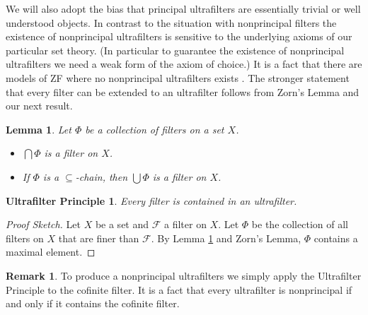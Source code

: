 \documentclass[12pt]{article}
\theoremstyle{plain}
\newtheorem{lem}[thm]{Lemma}
\newtheorem{up}[thm]{Ultrafilter Principle}
\theoremstyle{definition}
\newtheorem{rmk}[thm]{Remark}
\newcommand{\calF}{\mathcal{F}}
\begin{document}
We will also adopt the bias that principal ultrafilters are essentially trivial or well understood objects.
In contrast to the situation with nonprincipal filters the existence of nonprincipal ultrafilters is sensitive to the underlying axioms of our particular set theory.
(In particular to guarantee the existence of nonprincipal ultrafilters we need a weak form of the axiom of choice.)
It is a fact that there are models of ZF where no nonprincipal ultrafilters exists \cite{Blass:1977fk}.
The stronger statement that every filter can be extended to an ultrafilter follows from Zorn's Lemma and our next result.%

\begin{lem}
  \label{lem:chainFlt}
  Let $\Phi$ be a collection of filters on a set $X$.
  \begin{itemize}
    \item[(a)] $\bigcap\Phi$ is a filter on $X$.

    \item[(b)] If $\Phi$ is a \mbox{$\subseteq$-chain}, then $\bigcup\Phi$ is a filter on $X$.
  \end{itemize}
\end{lem}

\begin{up}
  Every filter is contained in an ultrafilter.
\end{up}
\begin{proof}[Proof Sketch]
  Let $X$ be a set and $\calF$ a filter on $X$.
  Let $\Phi$ be the collection of all filters on $X$ that are finer than $\calF$.
  By Lemma \ref{lem:chainFlt} and Zorn's Lemma, $\Phi$ contains a maximal element.
\end{proof}
\begin{rmk}
  To produce a nonprincipal ultrafilters we simply apply the Ultrafilter Principle to the cofinite filter.
  It is a fact that every ultrafilter is nonprincipal if and only if it contains the cofinite filter.
\end{rmk}
\end{document}
